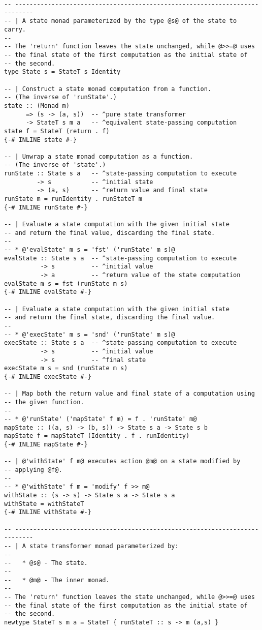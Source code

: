\begin{lstlisting}
-- ---------------------------------------------------------------------------
-- | A state monad parameterized by the type @s@ of the state to carry.
--
-- The 'return' function leaves the state unchanged, while @>>=@ uses
-- the final state of the first computation as the initial state of
-- the second.
type State s = StateT s Identity

-- | Construct a state monad computation from a function.
-- (The inverse of 'runState'.)
state :: (Monad m)
      => (s -> (a, s))  -- ^pure state transformer
      -> StateT s m a   -- ^equivalent state-passing computation
state f = StateT (return . f)
{-# INLINE state #-}

-- | Unwrap a state monad computation as a function.
-- (The inverse of 'state'.)
runState :: State s a   -- ^state-passing computation to execute
         -> s           -- ^initial state
         -> (a, s)      -- ^return value and final state
runState m = runIdentity . runStateT m
{-# INLINE runState #-}

-- | Evaluate a state computation with the given initial state
-- and return the final value, discarding the final state.
--
-- * @'evalState' m s = 'fst' ('runState' m s)@
evalState :: State s a  -- ^state-passing computation to execute
          -> s          -- ^initial value
          -> a          -- ^return value of the state computation
evalState m s = fst (runState m s)
{-# INLINE evalState #-}

-- | Evaluate a state computation with the given initial state
-- and return the final state, discarding the final value.
--
-- * @'execState' m s = 'snd' ('runState' m s)@
execState :: State s a  -- ^state-passing computation to execute
          -> s          -- ^initial value
          -> s          -- ^final state
execState m s = snd (runState m s)
{-# INLINE execState #-}

-- | Map both the return value and final state of a computation using
-- the given function.
--
-- * @'runState' ('mapState' f m) = f . 'runState' m@
mapState :: ((a, s) -> (b, s)) -> State s a -> State s b
mapState f = mapStateT (Identity . f . runIdentity)
{-# INLINE mapState #-}

-- | @'withState' f m@ executes action @m@ on a state modified by
-- applying @f@.
--
-- * @'withState' f m = 'modify' f >> m@
withState :: (s -> s) -> State s a -> State s a
withState = withStateT
{-# INLINE withState #-}

-- ---------------------------------------------------------------------------
-- | A state transformer monad parameterized by:
--
--   * @s@ - The state.
--
--   * @m@ - The inner monad.
--
-- The 'return' function leaves the state unchanged, while @>>=@ uses
-- the final state of the first computation as the initial state of
-- the second.
newtype StateT s m a = StateT { runStateT :: s -> m (a,s) }


\end{lstlisting}

